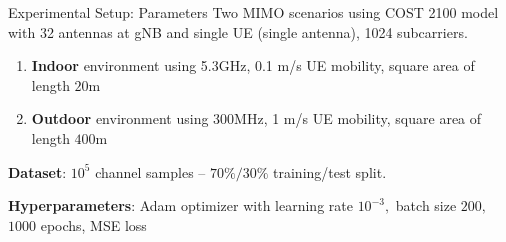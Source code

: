 \documentclass{beamer}
\begin{document}

  \begin{frame}{Experimental Setup: Parameters}
    Two MIMO scenarios using COST 2100 model with 32 antennas at gNB and single UE (single antenna), 1024 subcarriers.
    \begin{enumerate}
        \item \textbf{Indoor} environment using 5.3GHz, 0.1 m/s UE mobility, square area of length $20$m
        \item \textbf{Outdoor} environment using 300MHz, 1 m/s UE mobility, square area of length $400$m
    \end{enumerate}
    \textbf{Dataset}: $10^5$ channel samples -- $70\% / 30\% $ training/test split. %

    \textbf{Hyperparameters}: Adam optimizer with learning rate $10^{-3},$ batch size $200,$ $1000$ epochs, MSE loss
  \end{frame}
\end{document}
